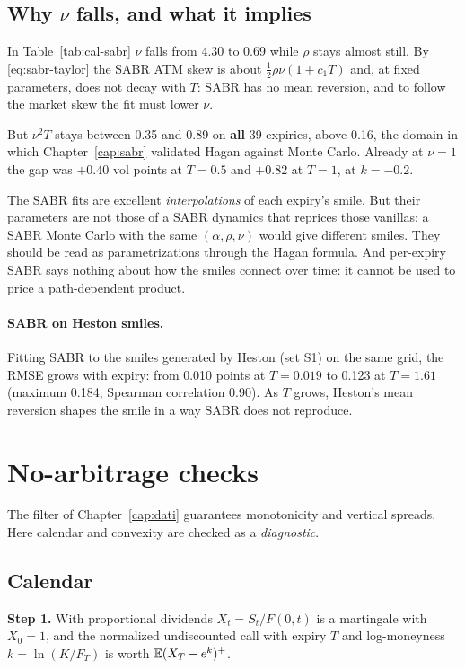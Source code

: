 \subsection{\texorpdfstring{Why $\nu$ falls, and what it implies}{Why nu falls, and what it implies}}
In Table~\ref{tab:cal-sabr} $\nu$ falls from 4.30 to 0.69 while $\rho$ stays almost still. By \eqref{eq:sabr-taylor}
the SABR ATM skew is about $\tfrac12\rho\nu(1+c_1T)$ and, at fixed parameters, does not decay with $T$: SABR has no
mean reversion, and to follow the market skew the fit must lower $\nu$.

But $\nu^2T$ stays between 0.35 and 0.89 on \textbf{all} 39 expiries, above 0.16, the domain in which Chapter~\ref{cap:sabr} validated Hagan against Monte Carlo. Already at $\nu=1$ the gap was $+0.40$ vol points at $T=0.5$ and
$+0.82$ at $T=1$, at $k=-0.2$.

\begin{attenzione}[title={A parametrization, not a dynamics}]
The SABR fits are excellent \emph{interpolations} of each expiry's smile. But their parameters are not those of a SABR
dynamics that reprices those vanillas: a SABR Monte Carlo with the same $(\alpha,\rho,\nu)$ would give different
smiles. They should be read as parametrizations through the Hagan formula. And per-expiry SABR says nothing about how
the smiles connect over time: it cannot be used to price a path-dependent product.
\end{attenzione}

\paragraph{SABR on Heston smiles.} Fitting SABR to the smiles generated by Heston (set S1) on the same grid, the RMSE
grows with expiry: from 0.010 points at $T=0.019$ to 0.123 at $T=1.61$ (maximum 0.184; Spearman correlation 0.90). As
$T$ grows, Heston's mean reversion shapes the smile in a way SABR does not reproduce.

\section{No-arbitrage checks}
The filter of Chapter~\ref{cap:dati} guarantees monotonicity and vertical spreads. Here calendar and convexity are
checked as a \emph{diagnostic}.

\subsection{Calendar}
\noindent\textbf{Step 1.} With proportional dividends $X_t=S_t/F(0,t)$ is a martingale with $X_0=1$, and the
normalized undiscounted call with expiry $T$ and log-moneyness $k=\ln(K/F_T)$ is worth $\mathbb{E}(X_T-e^k)^+$.

